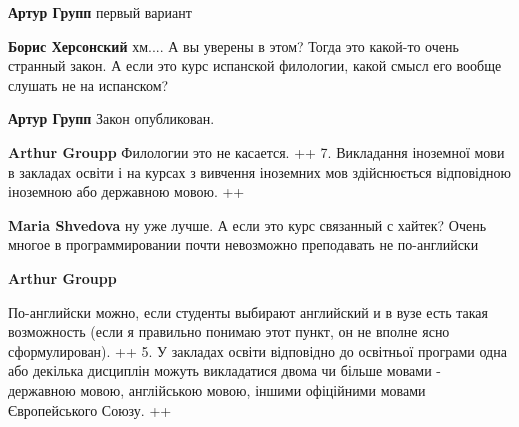 \begin{itemize}
\begin{itemize}
\textbf{Артур Групп} первый вариант

 
\textbf{Борис Херсонский} хм.... А вы уверены в этом? Тогда это какой-то очень странный закон. А если это курс испанской филологии, какой смысл его вообще слушать не на испанском?

 
\textbf{Артур Групп} Закон опубликован.

 
\textbf{Arthur Groupp} Филологии это не касается.
++
7. Викладання іноземної мови в закладах освіти і на курсах з вивчення іноземних мов здійснюється відповідною іноземною або державною мовою.
++

 
\textbf{Maria Shvedova} ну уже лучше. А если это курс связанный с хайтек? Очень многое в программировании почти невозможно преподавать не по-английски

 
\textbf{Arthur Groupp} 

По-английски можно, если студенты выбирают английский и в вузе есть такая возможность (если я правильно понимаю этот пункт, он не вполне ясно сформулирован).
++
5. У закладах освіти відповідно до освітньої програми одна або декілька дисциплін можуть викладатися двома чи більше мовами - державною мовою, англійською мовою, іншими офіційними мовами Європейського Союзу.
++


\end{itemize}
\end{itemize}
